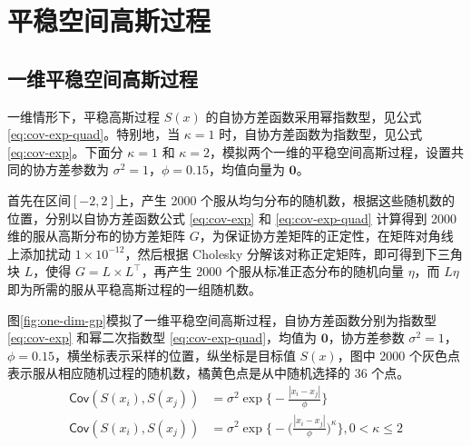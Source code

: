 \documentclass[12pt,a4paper,UTF8,twoside]{book}
\theoremstyle{definition}
\theoremstyle{definition}
\theoremstyle{definition}
\theoremstyle{remark}
\begin{document}
\hypertarget{spatial-gaussian-processes}{%
\section{平稳空间高斯过程}\label{spatial-gaussian-processes}}

\hypertarget{sim-one-gp}{%
\subsection{一维平稳空间高斯过程}\label{sim-one-gp}}

一维情形下，平稳高斯过程 \(S(x)\) 的自协方差函数采用幂指数型，见公式 \eqref{eq:cov-exp-quad}。特别地，当 \(\kappa = 1\) 时，自协方差函数为指数型，见公式 \eqref{eq:cov-exp}。下面分 \(\kappa =1\) 和 \(\kappa =2\)，模拟两个一维的平稳空间高斯过程，设置共同的协方差参数为 \(\sigma^2 = 1\)，\(\phi = 0.15\)，均值向量为 \(\mathbf{0}\)。

首先在区间\([-2,2]\)上，产生 2000 个服从均匀分布的随机数，根据这些随机数的位置，分别以自协方差函数公式 \eqref{eq:cov-exp} 和 \eqref{eq:cov-exp-quad} 计算得到 2000 维的服从高斯分布的协方差矩阵 \(G\)，为保证协方差矩阵的正定性，在矩阵对角线上添加扰动 \(1 \times 10^{-12}\)，然后根据 Cholesky 分解该对称正定矩阵，即可得到下三角块 \(L\)，使得 \(G = L \times L^{\top}\)，再产生 2000 个服从标准正态分布的随机向量 \(\eta\)，而 \(L\eta\) 即为所需的服从平稳高斯过程的一组随机数。

图\ref{fig:one-dim-gp}模拟了一维平稳空间高斯过程，自协方差函数分别为指数型 \eqref{eq:cov-exp} 和幂二次指数型 \eqref{eq:cov-exp-quad}，均值为 \(\mathbf{0}\)，协方差参数 \(\sigma^2 = 1\)，\(\phi = 0.15\)，横坐标表示采样的位置，纵坐标是目标值 \(S(x)\)，图中 2000 个灰色点表示服从相应随机过程的随机数，橘黄色点是从中随机选择的 36 个点。
\begin{align}
\mathsf{Cov}(S(x_i), S(x_j)) & = \sigma^2 \exp\big\{ - \frac{|x_{i} - x_{j}|}{ \phi } \big\}  \label{eq:cov-exp} \\
\mathsf{Cov}(S(x_i), S(x_j)) & = \sigma^2 \exp\big\{ -\big( \frac{ |x_{i} - x_{j}| }{ \phi } \big) ^ {\kappa} \big\}, 0 < \kappa \leq 2  \label{eq:cov-exp-quad} 
\end{align}
\end{document}
